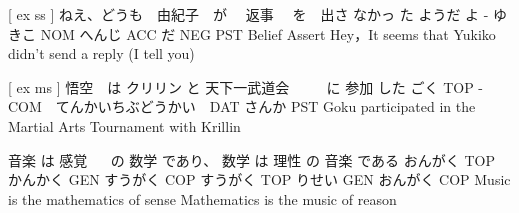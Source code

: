 [ ex ss ]
ねえ、どうも　由紀子　が　 返事　 を　出さ なかっ た  ようだ   よ
-          ゆきこ NOM へんじ ACC  だ   NEG PST Belief Assert
Hey，It seems that Yukiko didn't send a reply (I tell you)

[ ex ms ]
悟空　は  クリリン  と    天下一武道会 　　  に   参加 した
ごく TOP -　　　　COM　てんかいちぶどうかい　DAT さんか PST
Goku participated in the Martial Arts Tournament with Krillin

音楽    は   感覚 　 の   数学   であり、 数学  は  理性   の  音楽  である
おんがく TOP かんかく GEN すうがく COP すうがく TOP りせい GEN おんがく COP
Music is the mathematics of sense
Mathematics is the music of reason
